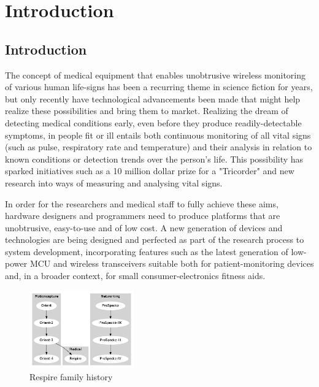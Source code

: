 
\chapter{Introduction}

\section{Introduction}

The concept of medical equipment that enables unobtrusive wireless monitoring of various human
life-signs has been a recurring theme in science fiction for years\cite{StarTrekStarFleetTechnicalManual1986}, but only recently have
technological advancements been made that might help realize these possibilities and bring them to
market. Realizing the dream of detecting medical conditions early, even before they produce readily-detectable
symptoms, in people fit or ill entails both continuous monitoring of all vital signs (such as
pulse, respiratory rate and temperature) and their analysis in relation to known conditions or
detection trends over the person’s life. This possibility has sparked initiatives such as a 10 million
dollar prize for a "Tricorder"\cite{XprizeHealth2012} and new research into ways of measuring and analysing vital
signs.


In order for the researchers and medical staff to fully achieve these aims, hardware designers and
programmers need to produce platforms that are unobtrusive, easy-to-use and of low cost. A new
generation of devices and technologies are being designed and perfected as part of the research
process to system development, incorporating features such as the latest generation of low-power
\ac{MCU} and wireless transceivers suitable both for patient-monitoring devices
and, in a broader context, for small  consumer-electronics fitness aids\cite{Jawbone2012, Fitbit2012}.

\begin{figure}
  \vspace{-10pt}
  \begin{center}
    \includegraphics[width=0.4\textwidth, keepaspectratio=true]{images/respire_family_history.png}
  \end{center}
  \caption{Respire family history}
  \vspace{-10pt}
\end{figure}

